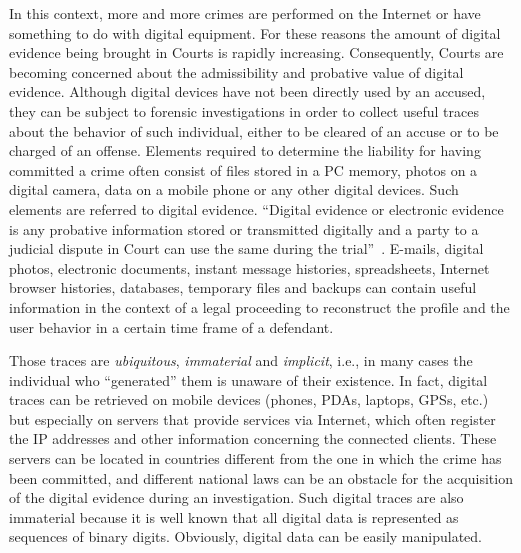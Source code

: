 \documentclass[10pt, conference]{IEEEtran}
\begin{document}
In this context, more and more crimes are performed on the Internet or have something to do with digital equipment. For these reasons
the amount of digital evidence being brought in Courts is rapidly increasing. Consequently, Courts are becoming concerned about the
admissibility and probative value of digital evidence. Although digital devices have not been directly used by an accused, they can be
subject to forensic investigations in order to collect useful traces about the behavior of such individual, either to be cleared of an accuse
or to be charged of an offense. Elements required to determine the liability for having committed a crime often consist of files stored in a
PC memory, photos on a digital camera, data on a mobile phone or any other digital devices. Such elements are referred to digital evidence.
``Digital evidence or electronic evidence is any probative information stored or transmitted digitally and a party to a judicial dispute in Court
can use the same during the trial''~\cite{uslegal}. E-mails, digital photos, electronic documents, instant message histories, spreadsheets,
Internet browser histories, databases, temporary files and backups can contain useful information in the context of a legal proceeding to
reconstruct the profile and the user behavior in a certain time frame of a defendant.

Those traces are \emph{ubiquitous}, \emph{immaterial} and \emph{implicit}, i.e., in many cases the individual who ``generated'' them
is unaware of their existence. In fact, digital traces can be retrieved on mobile devices (phones, PDAs, laptops, GPSs, etc.) but especially
on servers that provide services via Internet, which often register the IP addresses and other information concerning the connected clients.
These servers can be located in countries different from the one in which the crime has been committed, and different national laws can be
an obstacle for the acquisition of the digital evidence during an investigation.
Such digital traces are also immaterial because it is well known that all digital data is represented as sequences of binary digits. Obviously,
digital data can be easily manipulated.

\end{document}
